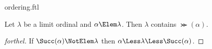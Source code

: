 \documentclass{stex}
\begin{document}
\begin{smodule}{ordering.ftl}
\begin{proposition*}[forthel]
  Let $\lambda$ be a limit ordinal and $\alpha \Elem \lambda$.
  Then $\lambda$ contains $\Succ(\alpha)$.
\end{proposition*}
\begin{proof}[forthel]
  If $\Succ(\alpha) \NotElem \lambda$ then $\alpha \Less \lambda \Less \Succ(\alpha)$.
\end{proof}

\end{smodule}
\end{document}
